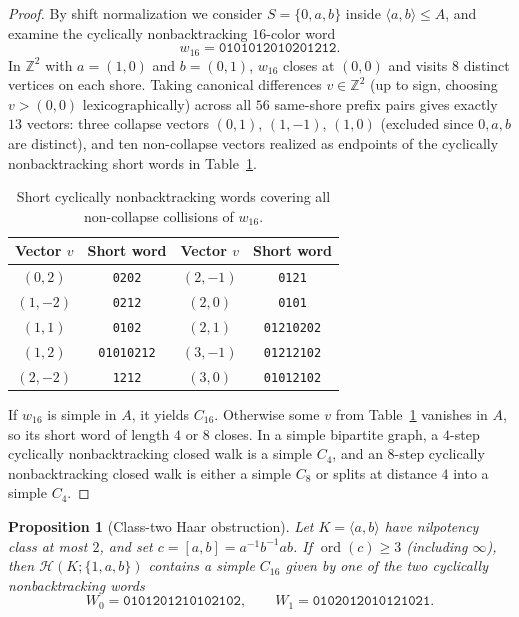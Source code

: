 \documentclass[11pt]{amsart}
\newtheorem{proposition}[theorem]{Proposition}
\theoremstyle{definition}
\theoremstyle{remark}
\newcommand{\Z}{\mathbb{Z}}
\newcommand{\Haar}{\mathcal{H}}
\newcommand{\ord}{\operatorname{ord}}
\begin{document}
\begin{proof}
By shift normalization we consider $S = \{0, a, b\}$ inside $\langle a, b \rangle \le A$, and examine the cyclically nonbacktracking $16$-color word
\[
w_{16} = \mathtt{0101012010201212}.
\]
In $\Z^2$ with $a=(1,0)$ and $b=(0,1)$, $w_{16}$ closes at $(0,0)$ and visits $8$ distinct vertices on each shore. Taking canonical differences $v \in \Z^2$ (up to sign, choosing $v > (0,0)$ lexicographically) across all $56$ same-shore prefix pairs gives exactly $13$ vectors: three collapse vectors $(0,1)$, $(1,-1)$, $(1,0)$ (excluded since $0,a,b$ are distinct), and ten non-collapse vectors realized as endpoints of the cyclically nonbacktracking short words in Table~\ref{tab:abelian_short}.

\begin{table}[ht]
\centering
\caption{Short cyclically nonbacktracking words covering all non-collapse collisions of $w_{16}$.}
\label{tab:abelian_short}
\begin{tabular}{cccc}
\toprule
Vector $v$ & Short word & Vector $v$ & Short word \\
\midrule
$(0,2)$  & \texttt{0202}     & $(2,-1)$ & \texttt{0121} \\
$(1,-2)$ & \texttt{0212}     & $(2,0)$  & \texttt{0101} \\
$(1,1)$  & \texttt{0102}     & $(2,1)$  & \texttt{01210202} \\
$(1,2)$  & \texttt{01010212} & $(3,-1)$ & \texttt{01212102} \\
$(2,-2)$ & \texttt{1212}     & $(3,0)$  & \texttt{01012102} \\
\bottomrule
\end{tabular}
\end{table}

If $w_{16}$ is simple in $A$, it yields $C_{16}$. Otherwise some $v$ from Table~\ref{tab:abelian_short} vanishes in $A$, so its short word of length $4$ or $8$ closes. In a simple bipartite graph, a $4$-step cyclically nonbacktracking closed walk is a simple $C_4$, and an $8$-step cyclically nonbacktracking closed walk is either a simple $C_8$ or splits at distance $4$ into a simple $C_4$.
\end{proof}

\begin{proposition}[Class-two Haar obstruction]\label{prop:class2}
Let $K = \langle a, b \rangle$ have nilpotency class at most $2$, and set $c = [a,b] = a^{-1} b^{-1} a b$. If $\ord(c) \ge 3$ (including $\infty$), then $\Haar(K; \{1, a, b\})$ contains a simple $C_{16}$ given by one of the two cyclically nonbacktracking words
\[
W_0 = \mathtt{0101201210102102},\qquad W_1 = \mathtt{0102012010121021}.
\]
\end{proposition}
\end{document}
